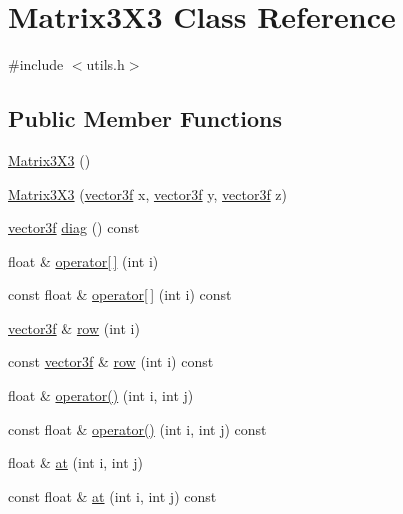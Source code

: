 \hypertarget{class_matrix3_x3}{}\section{Matrix3\+X3 Class Reference}
\label{class_matrix3_x3}


{\ttfamily \#include $<$utils.\+h$>$}

\subsection*{Public Member Functions}
\begin{DoxyCompactItemize}
\item 
\hyperlink{class_matrix3_x3_aefc0ab5df027c540ff7aa18ca7f2e2ec}{Matrix3\+X3} ()
\item 
\hyperlink{class_matrix3_x3_a804adaed742d23be9e1ba18c474b395b}{Matrix3\+X3} (\hyperlink{std__incl_8h_a2feaef1d85a74bd5cf80df91b1a9a914}{vector3f} x, \hyperlink{std__incl_8h_a2feaef1d85a74bd5cf80df91b1a9a914}{vector3f} y, \hyperlink{std__incl_8h_a2feaef1d85a74bd5cf80df91b1a9a914}{vector3f} z)
\item 
\hyperlink{std__incl_8h_a2feaef1d85a74bd5cf80df91b1a9a914}{vector3f} \hyperlink{class_matrix3_x3_a9ae9d007341bbf8b82f0043d3e791ba7}{diag} () const 
\item 
float \& \hyperlink{class_matrix3_x3_a86ce8bda4855d220934401f37064cdfc}{operator\mbox{[}$\,$\mbox{]}} (int i)
\item 
const float \& \hyperlink{class_matrix3_x3_acc1d51e5595ee722c8e3d110323a4ef1}{operator\mbox{[}$\,$\mbox{]}} (int i) const 
\item 
\hyperlink{std__incl_8h_a2feaef1d85a74bd5cf80df91b1a9a914}{vector3f} \& \hyperlink{class_matrix3_x3_a7ea824cc29ab1b8a79745f88782b46bb}{row} (int i)
\item 
const \hyperlink{std__incl_8h_a2feaef1d85a74bd5cf80df91b1a9a914}{vector3f} \& \hyperlink{class_matrix3_x3_a5e4c85454a8bbf3422c5d3d9152b7bc1}{row} (int i) const 
\item 
float \& \hyperlink{class_matrix3_x3_a6b7ee08dcc6939ed0e6870a45496de55}{operator()} (int i, int j)
\item 
const float \& \hyperlink{class_matrix3_x3_a9d15beebf98a21f596dd9d2aaddac465}{operator()} (int i, int j) const 
\item 
float \& \hyperlink{class_matrix3_x3_af543ad33dde1e3d8e1e9923e0514115f}{at} (int i, int j)
\item 
const float \& \hyperlink{class_matrix3_x3_a3df18d5523cb981b4cd92f44b47ecd10}{at} (int i, int j) const 

\end{DoxyCompactItemize}
